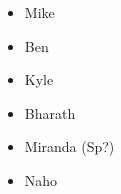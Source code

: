 \begin{itemize}
\item Mike
\item Ben
\item Kyle
\item Bharath
\item Miranda (Sp?)
\item Naho
\end{itemize}
